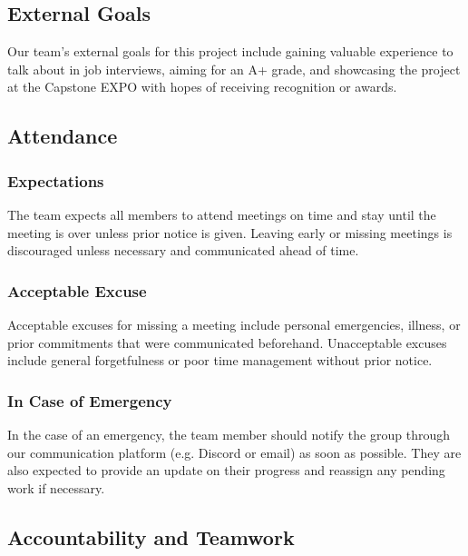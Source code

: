 \documentclass{article}
\begin{document}

\subsection*{External Goals}

Our team's external goals for this project include gaining valuable experience to talk
about in job interviews, aiming for an A+ grade, and showcasing the project at the Capstone
EXPO with hopes of receiving recognition or awards.

\subsection*{Attendance}

\subsubsection*{Expectations}

The team expects all members to attend meetings on time and stay until the meeting is over
unless prior notice is given. Leaving early or missing meetings is discouraged unless 
necessary and communicated ahead of time.

\subsubsection*{Acceptable Excuse}

Acceptable excuses for missing a meeting include personal emergencies, illness, or prior
commitments that were communicated beforehand. Unacceptable excuses include general
forgetfulness or poor time management without prior notice.

\subsubsection*{In Case of Emergency}

In the case of an emergency, the team member should notify the group through our communication
platform (e.g. Discord or email) as soon as possible. They are also expected to provide an update
on their progress and reassign any pending work if necessary.

\subsection*{Accountability and Teamwork}
\end{document}
